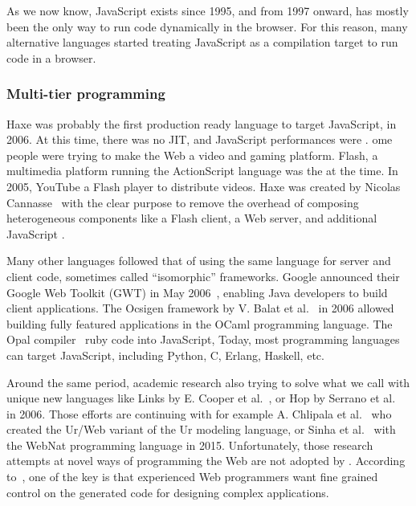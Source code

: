 As we now know, JavaScript exists since 1995, and from 1997 onward,
has mostly been the only way to run code dynamically in the browser.
For this reason, many alternative languages started treating JavaScript
as a compilation target to run code in a browser.

\subsubsection{Multi-tier programming}%
\label{ssub:multitier}

Haxe was probably the first production ready language to target JavaScript, in 2006.
At this time, there was no JIT, and JavaScript performances were .
 ome people were  trying to make the Web a video and gaming platform.
Flash, a multimedia platform running the ActionScript language was the  at the time.
In 2005, YouTube  a Flash player to distribute videos.
Haxe was created by Nicolas Cannasse~\cite{haxe-interview} with the clear purpose to remove the overhead of composing heterogeneous components like a Flash client,
a Web server, and additional JavaScript  .

Many other languages  followed that  of using the same language
for server and client code, sometimes called ``isomorphic'' frameworks.
Google announced their Google Web Toolkit (GWT) in May 2006~\cite{gwt},
enabling Java developers to build client applications.
The Ocsigen framework by V. Balat et al.~\cite{balat2006ocsigen} in 2006
allowed building fully featured applications in the OCaml programming language.
The Opal compiler~\cite{opalrb}  ruby code into JavaScript,
Today, most programming languages can target JavaScript,
including Python, C, Erlang, Haskell, etc.

Around the same period, academic research  also  trying to solve
what we call  with unique new languages like Links
by E. Cooper et al.~\cite{cooper2006links},
or Hop by Serrano et al.~\cite{serrano2006hop} in 2006.
Those efforts are continuing with for example
A. Chlipala et al.~\cite{chlipala2015ur} who created the Ur/Web variant
of the Ur modeling language,
or Sinha et al.~\cite{sinha2015simplifying} with the WebNat programming language in 2015.
Unfortunately, those research attempts at novel ways of programming the Web
are not  adopted by .
According to~\cite{sinha2015simplifying},
one of the key    is that experienced Web programmers want fine grained
control on the generated code for designing complex applications.

